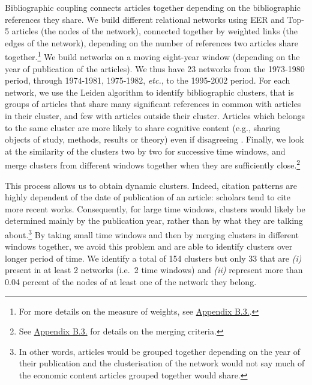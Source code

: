\documentclass[]{elsarticle} %
\begin{document}
Bibliographic coupling connects articles together depending on the
bibliographic references they share. We build different relational
networks using EER and Top-5 articles (the nodes of the network),
connected together by weighted links (the edges of the network),
depending on the number of references two articles share
together.\footnote{For more details on the measure of weights, see
  \protect\hyperlink{network}{Appendix B.3.}.} We build networks on a
moving eight-year window (depending on the year of publication of the
articles). We thus have 23 networks from the 1973-1980 period, through
1974-1981, 1975-1982, \emph{etc.}, to the 1995-2002 period. For each
network, we use the Leiden algorithm \citep{traag2019} to identify
bibliographic clusters, that is groups of articles that share many
significant references in common with articles in their cluster, and few
with articles outside their cluster. Articles which belongs to the same
cluster are more likely to share cognitive content (e.g., sharing
objects of study, methods, results or theory) even if disagreeing
\citep{claveau2016, truc2021, goutsmedt2021}. Finally, we look at the
similarity of the clusters two by two for successive time windows, and
merge clusters from different windows together when they are
sufficiently close.\footnote{See \protect\hyperlink{network}{Appendix
  B.3.} for details on the merging criteria.}

This process allows us to obtain dynamic clusters. Indeed, citation
patterns are highly dependent of the date of publication of an article:
scholars tend to cite more recent works. Consequently, for large time
windows, clusters would likely be determined mainly by the publication
year, rather than by what they are talking about.\footnote{In other
  words, articles would be grouped together depending on the year of
  their publication and the clusterisation of the network would not say
  much of the economic content articles grouped together would share.}
By taking small time windows and then by merging clusters in different
windows together, we avoid this problem and are able to identify
clusters over longer period of time. We identify a total of 154 clusters
but only 33 that are \emph{(i)} present in at least 2 networks (i.e.~2
time windows) and \emph{(ii)} represent more than 0.04 percent of the
nodes of at least one of the network they belong.
\end{document}
